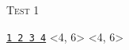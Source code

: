
\textsc{Test 1}
\begin{console}[commandchars=\\\{\}]
\underline{\texttt{1 2 3 4}}
<4, 6>
<4, 6>
\end{console}
